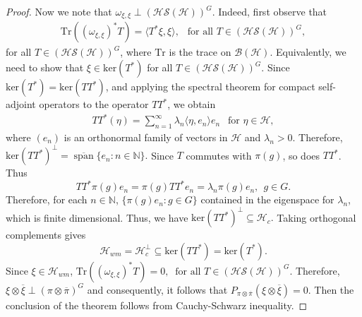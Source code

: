 \documentclass[11pt]{amsart}
\theoremstyle{definition}
\theoremstyle{myremark}
\newtheorem{rem}[thm]{Remark}
\numberwithin{equation}{section}
\def\N{\mathbb N}
\newcommand{\CB}{\mathcal{B}}
\newcommand{\CH}{\mathcal{H}}
\newcommand{\CS}{\mathcal{S}}
\newcommand{\abs}[1]{\left\vert#1\right\vert}
\begin{document}
\begin{proof}
\medskip 
\noindent
Now we note that  $ \omega_{\xi,\xi} \perp (\CH \CS(\CH))^{G}.$ Indeed, first observe that 
\begin{align*}
\text{Tr}((\omega_{\xi,\xi})^{*}T)=\langle T^{*}\xi,\xi \rangle, ~~ \text{ for all } T \in (\CH\CS(\CH))^{G},
\end{align*}
for all $T \in (\CH\CS(\CH))^{G}$, where  $\text{Tr}$ is the trace on $\CB(\CH)$. 
Equivalently, we need to show that $ \xi \in \text{ker}(T^*) $  for  all $ T \in (\CH\CS(\CH))^{G} $.  
Since $\text{ker}(T^*)=\text{ker}(TT^{*})$, and applying the spectral theorem for compact self-adjoint operators to the operator $TT^{*}$, we obtain
\begin{align*}
TT^{*}(\eta)=\sum_{n=1}^{\infty}\lambda_{n}\langle\eta,e_{n}\rangle e_{n}~~ \text{ for } \eta \in \CH,
\end{align*}
where \((e_n)\) is an orthonormal family of vectors in $\CH$ and \(\lambda_n>0\). Therefore, 
$ \text{ker}(TT^*)^\perp
=
\overline{\operatorname{span}}\{e_n:n\in\mathbb N\}.$
Since \(T\) commutes with \(\pi(g)\), so does \(TT^*\). Thus
\[
TT^*\pi(g)e_n
=
\pi(g)TT^*e_n
=
\lambda_n\pi(g)e_n,
~~ g\in G.
\]
Therefore, for each $n \in \N$,    $ \{ \pi(g)e_n : g \in G  \}  $ contained in the eigenspace for $ \lambda_n$, which is finite dimensional. Thus,   we have $ \text{ker}(TT^*)^\perp\subseteq\mathcal H_c.$
Taking orthogonal complements gives
\[
\mathcal H_{wm}
=
\mathcal H_c^\perp
\subseteq
\text{ker}(TT^*)
=
\text{ker}(T^*).
\]
Since $\xi \in \CH_{wm}$, $ \text{Tr}((\omega_{\xi,\xi})^{*}T)=0, ~ \text{ for all } T \in (\CH\CS(\CH))^{G}.$
Therefore, $ \xi \otimes \overline{\xi} \perp (\pi\otimes \overline{\pi})^{G}$ and consequently, it follows that  $  P_{\pi \otimes \overline{\pi}}(\xi\otimes\overline{\xi})=0.$ Then the conclusion of the theorem follows from Cauchy-Schwarz  inequality.













\end{proof}
\end{document}
